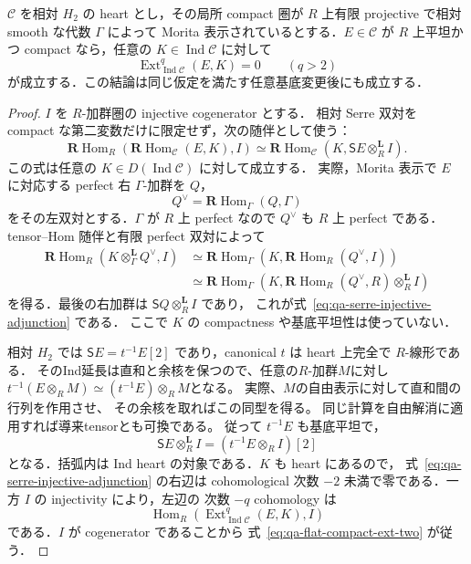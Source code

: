 \begin{lemma}[平坦compactな始域に対する相対Serre評価]
\label{lem:qa-flat-compact-ext-two}
$\mathcal C$ を相対 $H_2$ の heart とし，その局所 compact 圏が
$R$ 上有限 projective で相対 smooth な代数 $\Gamma$ によって
Morita 表示されているとする．$E\in\mathcal C$ が $R$ 上平坦かつ
compact なら，任意の $K\in\operatorname{Ind}\mathcal C$ に対して
\[
 \operatorname{Ext}^q_{\operatorname{Ind}\mathcal C}(E,K)=0
 \qquad(q>2)
 \tag{FE2}\label{eq:qa-flat-compact-ext-two}
\]
が成立する．この結論は同じ仮定を満たす任意基底変更後にも成立する．
\end{lemma}
\begin{proof}
$I$ を $R$-加群圏の injective cogenerator とする．
相対 Serre 双対を compact な第二変数だけに限定せず，次の随伴として使う：
\[
 \mathbf R\operatorname{Hom}_R
   (\mathbf R\operatorname{Hom}_{\mathcal C}(E,K),I)
 \simeq
 \mathbf R\operatorname{Hom}_{\mathcal C}
   (K,\mathsf S E\otimes_R^{\mathbf L}I).
 \tag{SA}\label{eq:qa-serre-injective-adjunction}
\]
この式は任意の $K\in D(\operatorname{Ind}\mathcal C)$ に対して成立する．
実際，Morita 表示で $E$ に対応する perfect 右 $\Gamma$-加群を $Q$，
\[
 Q^\vee=\mathbf R\operatorname{Hom}_\Gamma(Q,\Gamma)
\]
をその左双対とする．$\Gamma$ が $R$ 上 perfect なので $Q^\vee$ も
$R$ 上 perfect である．tensor--Hom 随伴と有限 perfect 双対によって
\[
 \begin{split}
 \mathbf R\operatorname{Hom}_R
  (K\otimes_\Gamma^{\mathbf L}Q^\vee,I)
 &\simeq \mathbf R\operatorname{Hom}_\Gamma
     (K,\mathbf R\operatorname{Hom}_R(Q^\vee,I))\\
 &\simeq \mathbf R\operatorname{Hom}_\Gamma
     (K,\mathbf R\operatorname{Hom}_R(Q^\vee,R)
                    \otimes_R^{\mathbf L}I)
 \end{split}
\]
を得る．最後の右加群は $\mathsf S Q\otimes_R^{\mathbf L}I$ であり，
これが式~\eqref{eq:qa-serre-injective-adjunction} である．
ここで $K$ の compactness や基底平坦性は使っていない．

相対 $H_2$ では $\mathsf S E=t^{-1}E[2]$ であり，canonical $t$ は
heart 上完全で $R$-線形である．
そのInd延長は直和と余核を保つので、任意の$R$-加群$M$に対し
$t^{-1}(E\otimes_R M)\simeq(t^{-1}E)\otimes_R M$となる。
実際、$M$の自由表示に対して直和間の行列を作用させ、
その余核を取ればこの同型を得る。
同じ計算を自由解消に適用すれば導来tensorとも可換である。
従って $t^{-1}E$ も基底平坦で，
\[
 \mathsf S E\otimes_R^{\mathbf L}I
       =(t^{-1}E\otimes_R I)[2]
\]
となる．括弧内は Ind heart の対象である．$K$ も heart にあるので，
式~\eqref{eq:qa-serre-injective-adjunction} の右辺は cohomological
次数 $-2$ 未満で零である．一方 $I$ の injectivity により，左辺の
次数 $-q$ cohomology は
\[
 \operatorname{Hom}_R
       (\operatorname{Ext}^q_{\operatorname{Ind}\mathcal C}(E,K),I)
\]
である．$I$ が cogenerator であることから
式~\eqref{eq:qa-flat-compact-ext-two} が従う．
\end{proof}

